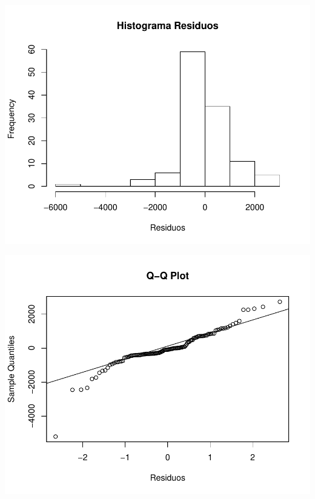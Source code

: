 \documentclass[11pt,a4paper,oneside]{article}\usepackage[]{graphicx}\usepackage[]{color}
\makeatletter
\def\maxwidth{ %
  \ifdim\Gin@nat@width>\linewidth
    \linewidth
  \else
    \Gin@nat@width
  \fi
}
\newenvironment{knitrout}{}{} %
\makeatother
\begin{document}
\begin{knitrout}
{\centering \includegraphics[width=\maxwidth]{figure/unnamed-chunk-16-23} 

}




{\centering \includegraphics[width=\maxwidth]{figure/unnamed-chunk-16-24} 

}





\end{knitrout}
\end{document}

